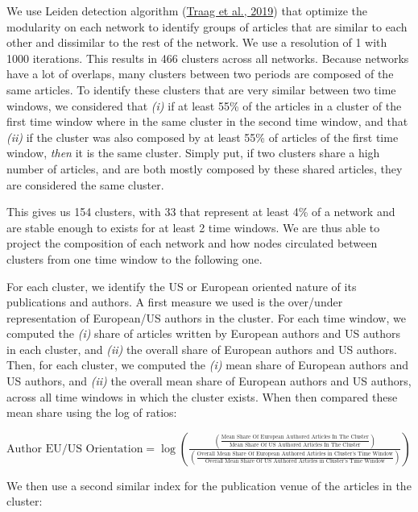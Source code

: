 \documentclass[
  12pt,
  onecolumn]{article}
\begin{document}
We use Leiden detection algorithm
(\protect\hyperlink{ref-traag2019}{Traag et al., 2019}) that optimize
the modularity on each network to identify groups of articles that are
similar to each other and dissimilar to the rest of the network. We use
a resolution of 1 with 1000 iterations. This results in 466 clusters
across all networks. Because networks have a lot of overlaps, many
clusters between two periods are composed of the same articles. To
identify these clusters that are very similar between two time windows,
we considered that \emph{(i)} if at least 55\% of the articles in a
cluster of the first time window where in the same cluster in the second
time window, and that \emph{(ii)} if the cluster was also composed by at
least 55\% of articles of the first time window, \emph{then} it is the
same cluster. Simply put, if two clusters share a high number of
articles, and are both mostly composed by these shared articles, they
are considered the same cluster.

This gives us 154 clusters, with 33 that represent at least 4\% of a
network and are stable enough to exists for at least 2 time windows. We
are thus able to project the composition of each network and how nodes
circulated between clusters from one time window to the following one.

For each cluster, we identify the US or European oriented nature of its
publications and authors. A first measure we used is the over/under
representation of European/US authors in the cluster. For each time
window, we computed the \emph{(i)} share of articles written by European
authors and US authors in each cluster, and \emph{(ii)} the overall
share of European authors and US authors. Then, for each cluster, we
computed the \emph{(i)} mean share of European authors and US authors,
and \emph{(ii)} the overall mean share of European authors and US
authors, across all time windows in which the cluster exists. When then
compared these mean share using the log of ratios:

\bigskip

\({\scriptstyle \text{Author EU/US Orientation}=\log(\frac{(\frac{\text{Mean Share Of European Authored Articles In The Cluster}}{\text{Mean Share Of US Authored Articles In The Cluster}})} {(\frac{\text{Overall Mean Share Of European Authored Articles in Cluster's Time Window}}{\text{Overall Mean Share Of US Authored Articles in Cluster's Time Window}})})}\)
\bigskip

We then use a second similar index for the publication venue of the
articles in the cluster:
\end{document}
